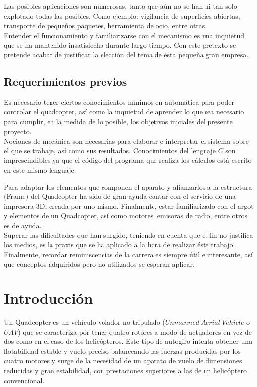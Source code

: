 \documentclass[twoside]{article}
\begin{document}
Las posibles aplicaciones son numerosas, tanto que aún no se han ni tan solo explotado todas las posibles. Como ejemplo: vigilancia de superficies abiertas, transporte de pequeños paquetes, herramienta de ocio, entre otras.\\

Entender el funcionamiento y familiarizarse con el mecanismo es una inquietud que se ha mantenido insatisfecha durante largo tiempo. Con este pretexto se pretende acabar de justificar la elección del tema de ésta pequeña gran empresa.

\subsection{Requerimientos previos}

Es necesario tener ciertos conocimientos mínimos en automática para poder controlar el quadcopter, así como la inquietud de aprender lo que sea necesario para cumplir, en la medida de lo posible, los objetivos iniciales del presente proyecto. \\

Nociones de mecánica son necesarias para elaborar e interpretar el sistema sobre el que se trabaje, así como sus resultados. Conocimientos del lenguaje $C$ son imprescindibles ya que el código del programa que realiza los cálculos está escrito en este mismo lenguaje. 

Para adaptar los elementos que componen el aparato y afianzarlos a la estructura (Frame)  del Quadcopter ha sido de gran ayuda contar con el servicio de una impresora 3D, creada por uno mismo. Finalmente, estar familiarizado con el argot y elementos de un Quadcopter, así como motores, emisoras de radio, entre otros es de ayuda. \\

Superar las dificultades que han surgido, teniendo en cuenta que el fin no justifica los medios, es la praxis que se ha aplicado a la hora de realizar éste trabajo. Finalmente, recordar reminiscencias de la carrera es siempre útil e interesante, así que conceptos adquiridos pero no utilizados se esperan aplicar.
 
\newpage
\section{Introducción} \label{intro}

Un Quadcopter es un vehículo volador no tripulado ($Unmanned \>Aerial\>Vehicle$ o $UAV$) que se caracteriza por tener quatro rotores a modo de actuadores en vez de dos como en el caso de los helicópteros. Este tipo de autogiro intenta obtener una flotabilidad estable y vuelo preciso balanceando las fuerzas producidas por los cuatro motores y surge de la necesidad de un aparato de vuelo de dimensiones reducidas y gran estabilidad, con prestaciones superiores a las de un helicóptero convencional. \\
\end{document}
